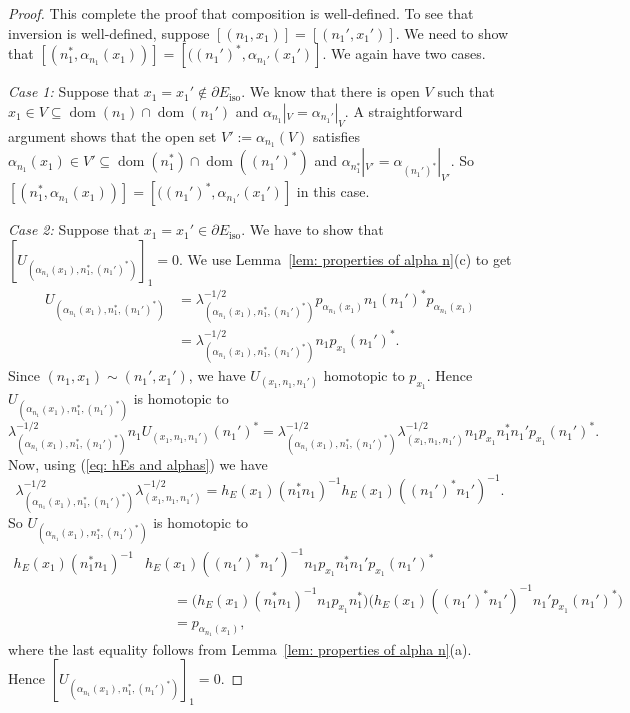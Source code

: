 \documentclass[12pt, a4paper]{amsart}
\numberwithin{equation}{section}
\theoremstyle{definition}
\theoremstyle{remark}
\begin{document}
\begin{proof}
This complete the proof that composition is well-defined. To see that 
inversion is well-defined, suppose $[(n_1,x_1)]=[(n_1',x_1')]$. We need to 
show 
that $[(n_1^*,\alpha_{n_1}(x_1))]=[((n_1')^*,\alpha_{n_1'}(x_1')]$. We again 
have two cases.

{\em Case 1:} Suppose that $x_1=x_1'\notin\partial E_{{\operatorname{iso}}}$. We know that there 
is open $V$ such that $x_1\in V\subseteq {{\operatorname{dom}}}(n_1)\cap{{\operatorname{dom}}}(n_1')$ and 
$\alpha_{n_1}|_V=\alpha_{n_1'}|_V$. A straightforward argument shows that the 
open set $V':=\alpha_{n_1}(V)$ satisfies $\alpha_{n_1}(x_1)\in V'\subseteq 
{{\operatorname{dom}}}(n_1^*)\cap {{\operatorname{dom}}}((n_1')^*)$ and
$\alpha_{n_1^*}|_{V'}=\alpha_{(n_1')^*}|_{V'}$. So 
$[(n_1^*,\alpha_{n_1}(x_1))]=[((n_1')^*,\alpha_{n_1'}(x_1')]$ in this case.

{\em Case 2:} Suppose that $x_1=x_1'\in\partial E_{{\operatorname{iso}}}$. We have to show that 
$[U_{(\alpha_{n_1}(x_1),n_1^*,(n_1')^*)}]_1=0$. We use Lemma~\ref{lem: 
properties of alpha n}(c) to get
\begin{align*}
U_{(\alpha_{n_1}(x_1),n_1^*,(n_1')^*)} 
&=\lambda_{(\alpha_{n_1}(x_1),n_1^*,(n_1')^*)}^{-1/2}
p_{\alpha_{n_1}(x_1)}n_1(n_1')^*p_{\alpha_{n_1}(x_1)}\\
&= \lambda_{(\alpha_{n_1}(x_1),n_1^*,(n_1')^*)}^{-1/2}n_1p_{x_1}(n_1')^*.
\end{align*}
Since $(n_1,x_1)\sim(n_1',x_1')$, we have $U_{(x_1,n_1,n_1')}$ homotopic to 
$p_{x_1}$. Hence $U_{(\alpha_{n_1}(x_1),n_1^*,(n_1')^*)}$ is homotopic to 
\[
\lambda_{(\alpha_{n_1}(x_1),n_1^*,(n_1')^*)}^{-1/2}n_1U_{(x_1,n_1,n_1')}(n_1')^*
=\lambda_{(\alpha_{n_1}(x_1),n_1^*,(n_1')^*)}^{-1/2}\lambda_{(x_1,n_1,n_1')}^{-1/2}
n_1p_{x_1}n_1^*n_1'p_{x_1}(n_1')^*.
\]
Now, using (\ref{eq: hEs and alphas}) we have
\[
\lambda_{(\alpha_{n_1}(x_1),n_1^*,(n_1')^*)}^{-1/2}\lambda_{(x_1,n_1,n_1')}^{-1/2}
= h_E(x_1)(n_1^*n_1)^{-1}h_E(x_1)((n_1')^*n_1')^{-1}.
\]
So $U_{(\alpha_{n_1}(x_1),n_1^*,(n_1')^*)}$ is homotopic to 
\begin{align*}
h_E(x_1)(n_1^*n_1)^{-1}&h_E(x_1)((n_1')^*n_1')^{-1}n_1p_{x_1}n_1^*n_1'p_{x_1}(n_1')^*
\\
&\qquad=\big(h_E(x_1)(n_1^*n_1)^{-1}n_1p_{x_1}n_1^*\big)\big(h_E(x_1)((n_1')^*n_1')^{-1}
n_1'p_{x_1}(n_1')^*\big)\\
&\qquad=p_{\alpha_{n_1}(x_1)},
\end{align*}
where the last equality follows from Lemma~\ref{lem: properties of alpha 
n}(a). Hence $[U_{(\alpha_{n_1}(x_1),n_1^*,(n_1')^*)}]_1=0$.
\end{proof}
\end{document}
